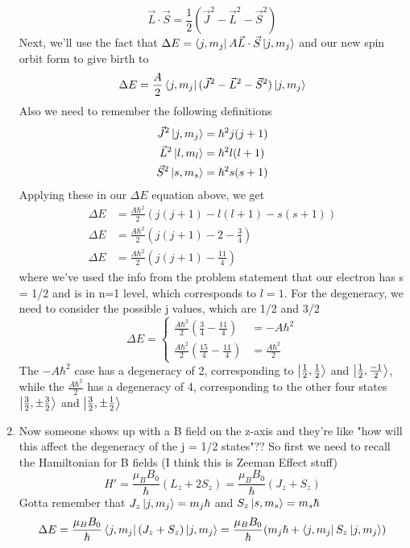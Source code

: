 \documentclass{article}
\begin{document}
\begin{enumerate}[label=\alph*)]
\[		\vec{L}\cdot\vec{S} = \frac{1}{2}(\vec{J}^2 - \vec{L}^2 - \vec{S}^2)
	\]
	Next, we'll use the fact that $\Delta E = \bra{j, m_j} A\vec{L}\cdot\vec{S} \ket{j, m_j}$ and our new spin orbit form to give birth to 
	\[
		\Delta E = \frac{A}{2}\bra{j, m_j}(\vec{J}^2 - \vec{L}^2 - \vec{S}^2) \ket{j, m_j}
	\]
	Also we need to remember the following definitions 
	\begin{align}
		\vec{J}^2 \ket{j, m_j} &= \hbar^2 j(j+1) \\ 
		\vec{L}^2 \ket{l, m_l} &= \hbar^2 l(l+1) \\
		\vec{S}^2 \ket{s, m_s} &= \hbar^2 s(s+1) 
	\end{align}
	Applying these in our $\Delta E$ equation above, we get
	\begin{align}
		\Delta E &= \frac{A\hbar^2}{2}\left(j(j+1) - l(l+1) - s(s+1)\right) \\
		\Delta E &= \frac{A\hbar^2}{2}\left(j(j+1) - 2 - \frac{3}{4} \right) \\
		\Delta E &= \frac{A\hbar^2}{2}\left(j(j+1) - \frac{11}{4} \right)
	\end{align}
	where we've used the info from the problem statement that our electron has s = 1/2 and is in n=1 level, which corresponds to $l=1$. For the degeneracy, we need to consider the possible j values, which are 1/2 and 3/2
	\[ \Delta E = \begin{cases} 
      		\frac{A\hbar^2}{2}\left(\frac{3}{4} - \frac{11}{4}\right) &= -A\hbar^2\\
      		\frac{A\hbar^2}{2}\left(\frac{15}{4} - \frac{11}{4}\right) &= \frac{A\hbar^2}{2} 
   	\end{cases}
	\]
	The $-A\hbar^2$ case has a degeneracy of 2, corresponding to $\ket{\frac{1}{2}, \frac{1}{2}}$ and $\ket{\frac{1}{2}, \frac{-1}{2}}$, while the $\frac{A\hbar^2}{2}$ has a degeneracy of 4, corresponding to the other four states $\ket{\frac{3}{2}, \pm\frac{3}{2}}$ and $\ket{\frac{3}{2}, \pm\frac{1}{2}}$
	\item %
	Now someone shows up with a B field on the z-axis and they're like "how will this affect the degeneracy of the j = 1/2 states"?? So first we need to  recall the Hamiltonian for B fields (I think this is Zeeman Effect stuff)
	\[ H' = \frac{\mu_{B}B_0}{\hbar}(L_z + 2S_z) = \frac{\mu_{B}B_0}{\hbar}(J_z + S_z) \]
	Gotta remember that $J_z \ket{j, m_j} = m_j \hbar$ and $S_z \ket{s, m_s} = m_s \hbar$
	\[
		\Delta E = \frac{\mu_{B}B_0}{\hbar}\bra{j, m_j}(J_z + S_z) \ket{j, m_j} = \frac{\mu_{B}B_0}{\hbar}(m_j\hbar +\bra{j, m_j}S_z\ket{j, m_j})
\]
\end{enumerate}
\end{document}
